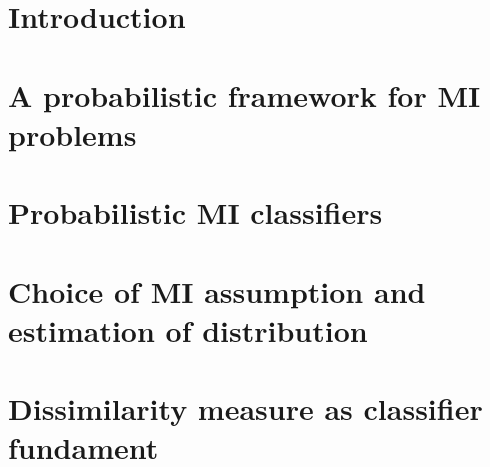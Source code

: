 \documentclass[preprint,12pt]{elsarticle}
\begin{document}
\newcommand{\cpos}{\text{\scriptsize{{\it POS}}}}
\newcommand{\cneg}{\text{\scriptsize{{\it NEG}}}}


\begin{frontmatter}







\end{frontmatter}

\clearpage

\section{Introduction} \label{sec:Introduction} 


\section{A probabilistic framework for MI problems} \label{sec:Probabilistic} 


% 

% 

\section{Probabilistic MI classifiers} \label{sec:Classifier}


\section{Choice of MI assumption and estimation of distribution} \label{sec:Distribution}


\section{Dissimilarity measure as classifier fundament} \label{sec:Dissimilarity}

\end{document}
